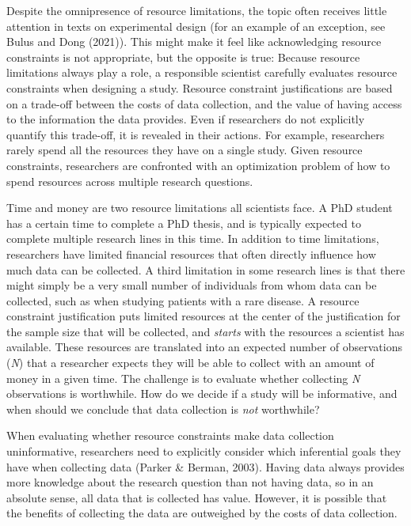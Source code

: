 \documentclass[
  english,
  ,jou,floatsintext]{apa6}
\begin{document}
Despite the omnipresence of resource limitations, the topic often receives little attention in texts on experimental design (for an example of an exception, see Bulus and Dong (2021)). This might make it feel like acknowledging resource constraints is not appropriate, but the opposite is true: Because resource limitations always play a role, a responsible scientist carefully evaluates resource constraints when designing a study. Resource constraint justifications are based on a trade-off between the costs of data collection, and the value of having access to the information the data provides. Even if researchers do not explicitly quantify this trade-off, it is revealed in their actions. For example, researchers rarely spend all the resources they have on a single study. Given resource constraints, researchers are confronted with an optimization problem of how to spend resources across multiple research questions.

Time and money are two resource limitations all scientists face. A PhD student has a certain time to complete a PhD thesis, and is typically expected to complete multiple research lines in this time. In addition to time limitations, researchers have limited financial resources that often directly influence how much data can be collected. A third limitation in some research lines is that there might simply be a very small number of individuals from whom data can be collected, such as when studying patients with a rare disease. A resource constraint justification puts limited resources at the center of the justification for the sample size that will be collected, and \emph{starts} with the resources a scientist has available. These resources are translated into an expected number of observations (\emph{N}) that a researcher expects they will be able to collect with an amount of money in a given time. The challenge is to evaluate whether collecting \emph{N} observations is worthwhile. How do we decide if a study will be informative, and when should we conclude that data collection is \emph{not} worthwhile?

When evaluating whether resource constraints make data collection uninformative, researchers need to explicitly consider which inferential goals they have when collecting data (Parker \& Berman, 2003). Having data always provides more knowledge about the research question than not having data, so in an absolute sense, all data that is collected has value. However, it is possible that the benefits of collecting the data are outweighed by the costs of data collection.
\end{document}
